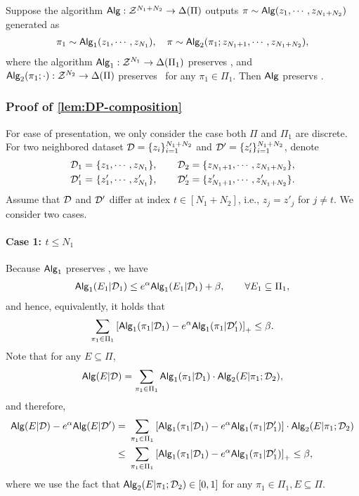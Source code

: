 \begin{lemma} \label{lem:DP-composition}
Suppose the algorithm $\mathsf{Alg}: \mathcal{Z}^{N_1+N_2}\to \Delta(\Pi)$ outputs $\pi\sim \mathsf{Alg}(z_1,\cdots,z_{N_1+N_2})$ generated as
\begin{align*}
    \pi_1\sim \mathsf{Alg}_1(z_1,\cdots,z_{N_1}), \quad
    \pi\sim \mathsf{Alg}_2(\pi_1; z_{N_1+1},\cdots,z_{N_1+N_2}),
\end{align*}
where the algorithm $\mathsf{Alg}_1:\mathcal{Z}^{N_1}\to \Delta(\Pi_1)$ preserves \aJDP, and $\mathsf{Alg}_2(\pi_1;\cdot):\mathcal{Z}^{N_2}\to \Delta(\Pi)$ preserves \aJDP~for any $\pi_1\in\Pi_1$. Then $\mathsf{Alg}$ preservs \aJDP.
\end{lemma}

\subsubsection{Proof of \cref{lem:DP-composition}}

For ease of presentation, we only consider the case both $\Pi$ and $\Pi_1$ are discrete.
For two neighbored dataset $\mathcal{D}=\{z_i\}_{i=1}^{N_1+N_2}$ and $\mathcal{D}'=\{z'_i\}_{i=1}^{N_1+N_2}$, denote 
\begin{align*}
    \mathcal{D}_1=&~  \{z_1,\cdots, z_{N_1}\}, \qquad 
    \mathcal{D}_2=\{z_{N_1+1},\cdots, z_{N_1+N_2}\}, \\
    \mathcal{D}_1'=&~  \{z_1',\cdots, z_{N_1}'\}, \qquad 
    \mathcal{D}_2'=\{z_{N_1+1}',\cdots, z_{N_1+N_2}'\}.
\end{align*}
Assume that $\mathcal{D}$ and $\mathcal{D}'$ differ at index $t\in[N_1+N_2]$, i.e., $z_j=z'_j $ for $j\neq t$. We consider two cases.

\paragraph{Case 1: $t\leq N_1$}
Because $\mathsf{Alg}_1$ preserves \aJDP, we have
\begin{align*}
    \mathsf{Alg}_1(E_1|\mathcal{D}_1)\leq e^{\alpha} \mathsf{Alg}_1(E_1|\mathcal{D}_1)+\beta, \qquad \forall E_1\subseteq \Pi_1,
\end{align*}
and hence, equivalently, it holds that
\begin{align*}
    \sum_{\pi_1\in\Pi_1} {\left[  \mathsf{Alg}_1(\pi_1|\mathcal{D}_1)-e^{\alpha} \mathsf{Alg}_1(\pi_1|\mathcal{D}_1')  \right]}_+ \leq \beta.
\end{align*}
Note that for any $E\subseteq \Pi$,
\begin{align*}
    \mathsf{Alg}(E|\mathcal{D})=\sum_{\pi_1\in\Pi_1} \mathsf{Alg}_1(\pi_1|\mathcal{D}_1) \cdot \mathsf{Alg}_2(E|\pi_1;\mathcal{D}_2),
\end{align*}
and therefore,
\begin{align*}
    \mathsf{Alg}(E|\mathcal{D})-e^{\alpha}\mathsf{Alg}(E|\mathcal{D}')=&~\sum_{\pi_1\in\Pi_1} {\left[  \mathsf{Alg}_1(\pi_1|\mathcal{D}_1) - e^{\alpha} \mathsf{Alg}_1(\pi_1|\mathcal{D}_1')  \right]}\cdot \mathsf{Alg}_2(E|\pi_1;\mathcal{D}_2) \\
    \leq&~ \sum_{\pi_1\in\Pi_1} {\left[  \mathsf{Alg}_1(\pi_1|\mathcal{D}_1) - e^{\alpha} \mathsf{Alg}_1(\pi_1|\mathcal{D}_1')  \right]}_+\leq \beta,
\end{align*}
where we use the fact that $\mathsf{Alg}_2(E|\pi_1;\mathcal{D}_2)\in[0,1]$ for any $\pi_1\in\Pi_1, E\subseteq \Pi$.

